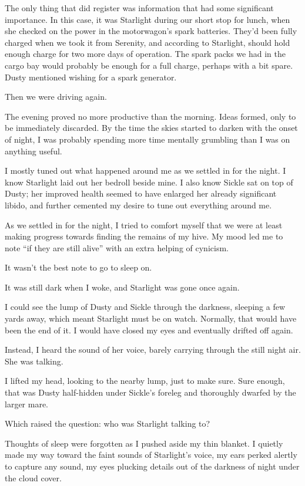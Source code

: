 The only thing that did register was information that had some significant importance. In this case, it was Starlight during our short stop for lunch, when she checked on the power in the motorwagon’s spark batteries. They’d been fully charged when we took it from Serenity, and according to Starlight, should hold enough charge for two more days of operation. The spark packs we had in the cargo bay would probably be enough for a full charge, perhaps with a bit spare. Dusty mentioned wishing for a spark generator.

Then we were driving again.

The evening proved no more productive than the morning. Ideas formed, only to be immediately discarded. By the time the skies started to darken with the onset of night, I was probably spending more time mentally grumbling than I was on anything useful.

I mostly tuned out what happened around me as we settled in for the night. I know Starlight laid out her bedroll beside mine. I also know Sickle sat on top of Dusty; her improved health seemed to have enlarged her already significant libido, and further cemented my desire to tune out everything around me.

As we settled in for the night, I tried to comfort myself that we were at least making progress towards finding the remains of my hive. My mood led me to note “if they are still alive” with an extra helping of cynicism.

It wasn’t the best note to go to sleep on.

{\br}%
It was still dark when I woke, and Starlight was gone once again.

I could see the lump of Dusty and Sickle through the darkness, sleeping a few yards away, which meant Starlight must be on watch. Normally, that would have been the end of it. I would have closed my eyes and eventually drifted off again.

Instead, I heard the sound of her voice, barely carrying through the still night air. She was talking.

I lifted my head, looking to the nearby lump, just to make sure. Sure enough, that was Dusty half-hidden under Sickle’s foreleg and thoroughly dwarfed by the larger mare.

Which raised the question: who was Starlight talking to?

Thoughts of sleep were forgotten as I pushed aside my thin blanket. I quietly made my way toward the faint sounds of Starlight’s voice, my ears perked alertly to capture any sound, my eyes plucking details out of the darkness of night under the cloud cover.

